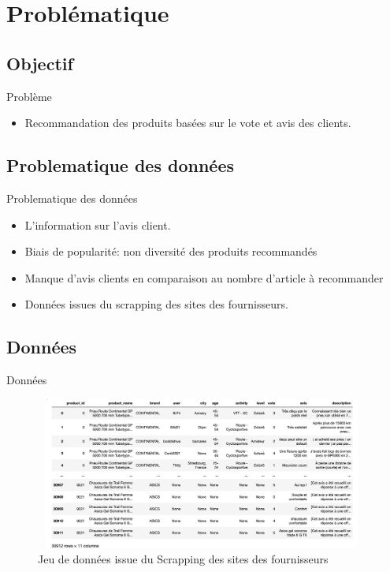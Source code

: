\documentclass[xelatex,12pt]{beamer}
\begin{document}
\section{Problématique}

\subsection{Objectif}

\begin{frame}{Problème}
  \begin{itemize}
  \item Recommandation des produits basées sur le vote et avis des clients.
  \end{itemize}
\end{frame}

\subsection{Problematique des données}
\begin{frame}{Problematique des données}
\begin{itemize}
  \item L’information sur l’avis client.
  \item Biais de popularité: non diversité des produits recommandés
  \item Manque d’avis clients en comparaison au nombre d’article à recommander
  \item Données issues du scrapping des sites des fournisseurs.
  \end{itemize}
\end{frame}

\subsection{Données}
\begin{frame}{Données}
\begin{figure}[h]
\begin{center}
\includegraphics[width=11cm,height=5cm]{images/sample_data.jpeg}
\caption[Jeu de données issue du Scrapping des sites des fournisseurs]{Jeu de données issue du Scrapping des sites des fournisseurs}
\label{monlabel}
\end{center}
\end{figure}
\end{frame}
\end{document}
